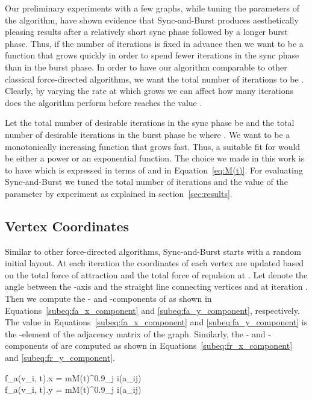 \documentclass{llncs}
\begin{document}
Our preliminary experiments with a few graphs, while tuning the parameters of the algorithm, have shown evidence that Sync-and-Burst produces aesthetically pleasing results after a relatively short sync phase followed by a longer burst phase. Thus, if the number of iterations is fixed in advance then we want  to be a function that grows quickly in order to spend fewer iterations in the sync phase than in the burst phase. In order to have our algorithm comparable to other classical force-directed algorithms, we want the total number of iterations to be . Clearly, by varying the rate at which  grows we can affect how many iterations does the algorithm perform before  reaches the value . 

Let the total number of desirable iterations in the sync phase be  and the total number of desirable iterations in the burst phase be  where . We want  to be a monotonically increasing function that grows fast. Thus, a suitable fit for  would be either a power or an exponential function. The choice we made in this work is to have  which is expressed in terms of  and  in Equation~\eqref{eq:M(t)}. For evaluating Sync-and-Burst we tuned the total number of iterations  and the value of the parameter  by experiment as explained in section~\ref{sec:results}.



\subsection{Vertex Coordinates}\label{subsec:algorithm:coordinates}

Similar to other force-directed algorithms, Sync-and-Burst starts with a random initial layout. At each iteration the coordinates of each vertex  are updated based on the total force of attraction  and the total force of repulsion  at . Let  denote the angle between the -axis and the straight line connecting vertices  and  at iteration . Then we compute the - and -components of  as shown in Equations~\eqref{subeq:fa_x_component} and \eqref{subeq:fa_y_component}, respectively. The value  in Equations~\eqref{subeq:fa_x_component} and \eqref{subeq:fa_y_component} is the -element of the adjacency matrix of the graph. Similarly, the - and -components of  are computed as shown in Equations~\eqref{subeq:fr_x_component} and \eqref{subeq:fr_y_component}. 


f_a(v_i, t).x = mM(t)^{0.9}\sum_{j \neq i}\big(a_{ij}\big)\label{subeq:fa_x_component}\\
f_a(v_i, t).y = mM(t)^{0.9}\sum_{j \neq i}\big(a_{ij}\big)\label{subeq:fa_y_component}
\end{document}
